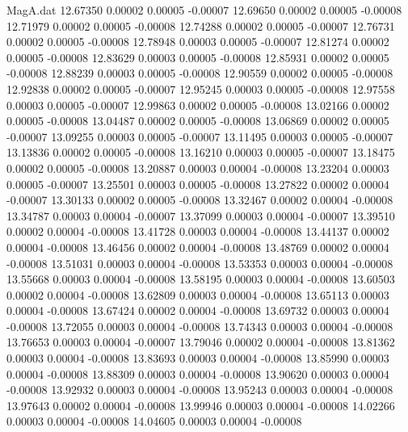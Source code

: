 \begin{filecontents}{MagA.dat}
  12.67350    0.00002    0.00005   -0.00007
  12.69650    0.00002    0.00005   -0.00008
  12.71979    0.00002    0.00005   -0.00008
  12.74288    0.00002    0.00005   -0.00007
  12.76731    0.00002    0.00005   -0.00008
  12.78948    0.00003    0.00005   -0.00007
  12.81274    0.00002    0.00005   -0.00008
  12.83629    0.00003    0.00005   -0.00008
  12.85931    0.00002    0.00005   -0.00008
  12.88239    0.00003    0.00005   -0.00008
  12.90559    0.00002    0.00005   -0.00008
  12.92838    0.00002    0.00005   -0.00007
  12.95245    0.00003    0.00005   -0.00008
  12.97558    0.00003    0.00005   -0.00007
  12.99863    0.00002    0.00005   -0.00008
  13.02166    0.00002    0.00005   -0.00008
  13.04487    0.00002    0.00005   -0.00008
  13.06869    0.00002    0.00005   -0.00007
  13.09255    0.00003    0.00005   -0.00007
  13.11495    0.00003    0.00005   -0.00007
  13.13836    0.00002    0.00005   -0.00008
  13.16210    0.00003    0.00005   -0.00007
  13.18475    0.00002    0.00005   -0.00008
  13.20887    0.00003    0.00004   -0.00008
  13.23204    0.00003    0.00005   -0.00007
  13.25501    0.00003    0.00005   -0.00008
  13.27822    0.00002    0.00004   -0.00007
  13.30133    0.00002    0.00005   -0.00008
  13.32467    0.00002    0.00004   -0.00008
  13.34787    0.00003    0.00004   -0.00007
  13.37099    0.00003    0.00004   -0.00007
  13.39510    0.00002    0.00004   -0.00008
  13.41728    0.00003    0.00004   -0.00008
  13.44137    0.00002    0.00004   -0.00008
  13.46456    0.00002    0.00004   -0.00008
  13.48769    0.00002    0.00004   -0.00008
  13.51031    0.00003    0.00004   -0.00008
  13.53353    0.00003    0.00004   -0.00008
  13.55668    0.00003    0.00004   -0.00008
  13.58195    0.00003    0.00004   -0.00008
  13.60503    0.00002    0.00004   -0.00008
  13.62809    0.00003    0.00004   -0.00008
  13.65113    0.00003    0.00004   -0.00008
  13.67424    0.00002    0.00004   -0.00008
  13.69732    0.00003    0.00004   -0.00008
  13.72055    0.00003    0.00004   -0.00008
  13.74343    0.00003    0.00004   -0.00008
  13.76653    0.00003    0.00004   -0.00007
  13.79046    0.00002    0.00004   -0.00008
  13.81362    0.00003    0.00004   -0.00008
  13.83693    0.00003    0.00004   -0.00008
  13.85990    0.00003    0.00004   -0.00008
  13.88309    0.00003    0.00004   -0.00008
  13.90620    0.00003    0.00004   -0.00008
  13.92932    0.00003    0.00004   -0.00008
  13.95243    0.00003    0.00004   -0.00008
  13.97643    0.00002    0.00004   -0.00008
  13.99946    0.00003    0.00004   -0.00008
  14.02266    0.00003    0.00004   -0.00008
  14.04605    0.00003    0.00004   -0.00008

\end{filecontents}
